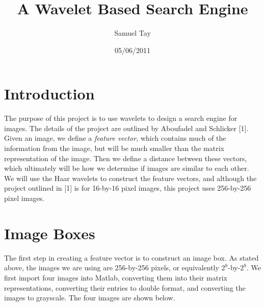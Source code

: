 \documentclass[11 pt]{article}
\title{A Wavelet Based Search Engine}
\author{Samuel Tay}
\date{05/06/2011}
\begin{document}
\maketitle

\section{Introduction}

\indent\indent The purpose of this project is to use wavelets to design a search engine for images. The details of the project are outlined by Aboufadel and Schlicker [1]. Given an image, we define a \emph{feature vector}, which contains much of the information from the image, but will be much smaller than the matrix representation of the image. Then we define a distance between these vectors, which ultimately will be how we determine if images are similar to each other. We will use the Haar wavelets to construct the feature vectors, and although the project outlined in [1]  is for 16-by-16 pixel images, this project uses 256-by-256 pixel images.
\section{Image Boxes}

\indent\indent The first step in creating a feature vector is to construct an image box. As stated above, the images we are using are 256-by-256 pixels, or equivalently $2^8$-by-$2^8$. We first import four images into Matlab, converting them into their matrix representations, converting their entries to double format, and converting the images to grayscale. The four images are shown below.
\end{document}
